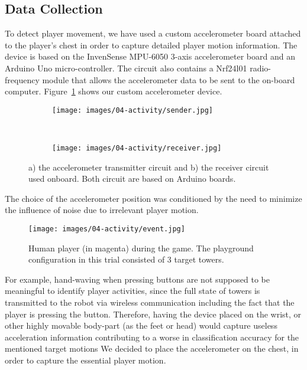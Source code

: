 \subsection{Data Collection}\label{datacollection}

To detect player movement, we have used a custom accelerometer board attached to the player's chest in order to capture detailed player motion information. The device is based on the InvenSense MPU-6050 3-axis accelerometer board and an Arduino Uno micro-controller. The circuit also contains a Nrf24l01 radio-frequency module that allows the accelerometer data to be sent to the on-board computer. Figure~\ref{fig:the_accelerometer} shows our custom accelerometer device.

\begin{figure}[H]
      \centering
      \begin{subfigure}[t]{0.5\textwidth}
      	\centering
	    \texttt{[image: images/04-activity/sender.jpg]}
	    \caption{}
	  \end{subfigure}
	  ~
	  \begin{subfigure}[t]{0.5\textwidth}
      	\centering
	    \texttt{[image: images/04-activity/receiver.jpg]}
	    \caption{}
	  \end{subfigure}
      \caption{a) the accelerometer transmitter circuit and b) the receiver circuit used onboard. Both circuit are based on Arduino boards.}\label{fig:the_accelerometer}
\end{figure}

The choice of the accelerometer position was conditioned by the need to minimize the influence of noise due to irrelevant player motion.

\begin{figure}[thpb]
      \centering
      {\texttt{[image: images/04-activity/event.jpg]}}
      \caption{Human player (in magenta) during the game. The playground configuration in this trial consisted of 3 target towers.}
      \label{game}
\end{figure}

For example, hand-waving when pressing buttons are not supposed to be meaningful to identify player activities, since the full state of towers is transmitted to the robot via wireless communication including the fact that the player is pressing the button. Therefore, having the device placed on the wrist, or other highly movable body-part (as the feet or head) would capture useless acceleration information contributing to a worse in classification accuracy for the mentioned target motions %
We decided to place the accelerometer on the chest, in order to capture the essential player motion.

